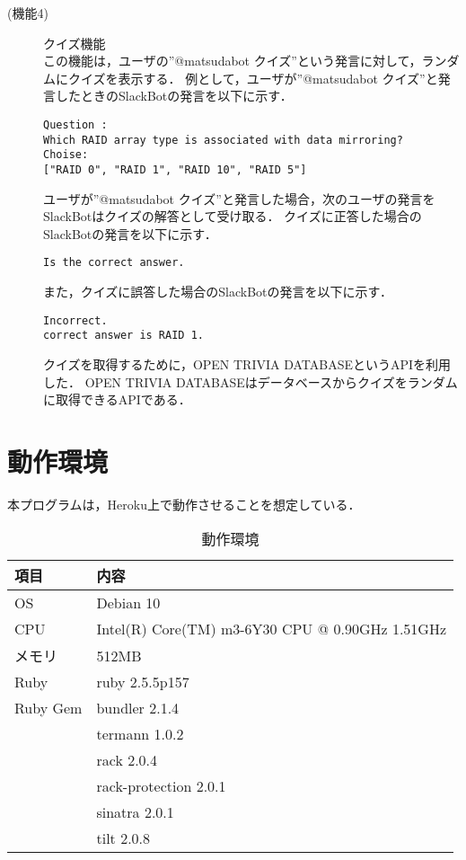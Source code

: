 \documentclass[12pt]{jsarticle}
\begin{document}
\begin{description}
\item[(機能4)] クイズ機能\\
この機能は，ユーザの''@matsudabot クイズ''という発言に対して，ランダムにクイズを表示する．
例として，ユーザが''@matsudabot クイズ''と発言したときのSlackBotの発言を以下に示す．
\begin{verbatim}
Question :
Which RAID array type is associated with data mirroring?
Choise:
["RAID 0", "RAID 1", "RAID 10", "RAID 5"]
\end{verbatim}
ユーザが''@matsudabot クイズ''と発言した場合，次のユーザの発言をSlackBotはクイズの解答として受け取る．
クイズに正答した場合のSlackBotの発言を以下に示す．
\begin{verbatim}
Is the correct answer.
\end{verbatim}
また，クイズに誤答した場合のSlackBotの発言を以下に示す．
\begin{verbatim}
Incorrect.
correct answer is RAID 1.
\end{verbatim}
クイズを取得するために，OPEN TRIVIA DATABASEというAPIを利用した．
OPEN TRIVIA DATABASEはデータベースからクイズをランダムに取得できるAPIである．
\end{description}

\section{動作環境}
本プログラムは，Heroku上で動作させることを想定している．
\begin{table}[h]
\begin{center}
\caption{動作環境}\label{tab:2}
\begin{tabular}{l|l}
\hline\hline
\multicolumn{1}{l|}{項目} & \multicolumn{1}{l}{内容}\\
\hline
OS & Debian 10\\
CPU & Intel(R) Core(TM) m3-6Y30 CPU @ 0.90GHz 1.51GHz\\
メモリ & 512MB\\
Ruby & ruby 2.5.5p157\\
Ruby Gem & bundler 2.1.4\\
& termann 1.0.2\\
& rack 2.0.4\\
& rack-protection 2.0.1\\
& sinatra 2.0.1\\ 
& tilt 2.0.8\\
\hline
\end{tabular}
\end{center}
\end{table}
\end{document}
